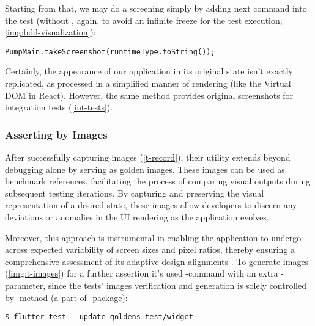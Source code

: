 \noindent Starting from that, we may do a screening simply by adding next command into the test (without , 
again, to avoid an infinite freeze for the test execution, \cref{img:bdd-visualization}):

\begin{lstlisting}
PumpMain.takeScreenshot(runtimeType.toString());
\end{lstlisting}  


Certainly, the appearance of our application in its original state isn't exactly replicated, as processed in a 
simplified manner of rendering (like the Virtual DOM in React). However, the same method provides original screenshots 
for integration tests (\cref{int-tests}).


\subsubsection{Asserting by Images} \label{golden-image}

After successfully capturing images (\cref{t-record}), their utility extends beyond debugging alone by serving as 
golden images. These images can be used as benchmark references, facilitating the process of comparing visual 
outputs during subsequent testing iterations. By capturing and preserving the visual representation of a desired state, 
these images allow developers to discern any deviations or anomalies in the UI rendering as the application evolves. 

Moreover, this approach is instrumental in enabling the application to undergo across expected variability of screen 
sizes and pixel ratios, thereby ensuring a comprehensive assessment of its adaptive design alignments 
. To generate images (\cref{img:t-images}) for a further assertion it's used -command with 
an extra -parameter, since the tests' images verification and generation is solely controlled by
-method (a part of -package):

\begin{lstlisting}[language=terminal]
$ flutter test --update-goldens test/widget
\end{lstlisting}


